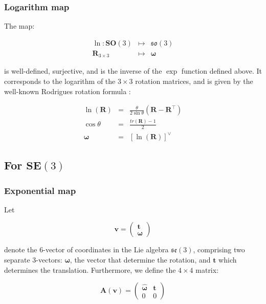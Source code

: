 \documentclass[a4paper,11pt]{report}
\newcommand{\W}{{\bm{\omega}}}
\begin{document}
\subsubsection{Logarithm map}
\label{sect:log_map_so3}

The map:

\begin{eqnarray}
  \ln: \mathbf{SO}(3) & \mapsto & \mathfrak{so}(3)   \\
           \mathbf{R}_{3\times 3} & \mapsto &  \W
\end{eqnarray}

\noindent is well-defined, surjective, and is the inverse of the $\exp$ function defined above.
It corresponds to the logarithm of the $3\times 3$ rotation matrices, and is given by the
well-known Rodrigues rotation formula \cite{altafini2000cas}:


\begin{eqnarray}
\label{eq:rodrigues_ln}
 \ln(\mathbf{R}) &=& \frac{\theta}{2\sin \theta} \left( \mathbf{R} - \mathbf{R}^\top
\right)
\nonumber \\
\cos \theta &=& \frac{tr(\mathbf{R})-1}{2}  \nonumber \\
\label{eq:log_so3}
 \W &=& \left[ \ln(\mathbf{R}) \right]^\vee
\end{eqnarray}


\subsection{For $\mathbf{SE}(3)$}

\subsubsection{Exponential map}
\label{sect:se3_exp}

Let

\begin{equation}
\label{eq:vector_in_se3}
\mathbf{v}= \left( \begin{array}{c} \mathbf{t} \\ \W \end{array} \right)
\end{equation}

\noindent denote the 6-vector of coordinates in
the Lie algebra $\mathfrak{se}(3)$,
comprising
two separate 3-vectors: $\W$, the vector that determine
the rotation, and $\mathbf{t}$ which determines the translation.
Furthermore, we define the $4 \times 4$ matrix:

\begin{equation}
 \mathbf{A}(\mathbf{v})=
\left(
\begin{array}{cc}
 \hat{\W}  & \mathbf{t} \\
 0 & 0
\end{array}
\right)
\end{equation}
\end{document}
